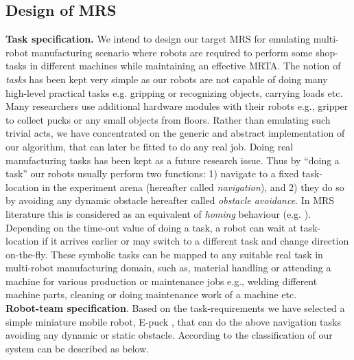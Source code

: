 \subsection{Design of MRS}
\label{expt-tools:mrs-design}
\textbf{Task specification.} We intend to design our target MRS for emulating multi-robot manufacturing scenario where robots are required to perform some shop-tasks in different machines while maintaining an effective MRTA. The notion of {\em tasks} has been kept very simple as our robots are not capable of doing many high-level practical tasks e.g. gripping or recognizing objects, carrying loads etc. Many researchers use additional hardware modules with their robots e.g., gripper to collect pucks or any small objects from floors. Rather than emulating such trivial acts, we have  concentrated on the generic and abstract implementation of our algorithm, that can later be fitted to do any real job. Doing real manufacturing tasks has been kept as a future research issue. Thus by ``doing a task'' our robots usually perform two functions: 1) navigate to a fixed task-location in the experiment arena (hereafter called {\em navigation}), and 2) they do so by avoiding any dynamic obstacle {hereafter called {\em obstacle avoidance}}. In MRS literature this is considered as an equivalent of {\em homing} behaviour (e.g. ). Depending on the time-out value of doing a task, a robot can wait at task-location if it arrives earlier or may switch to a different task and change direction on-the-fly. These symbolic tasks can be mapped to any suitable real task in multi-robot manufacturing domain, such as, material handling or attending a machine for various production or maintenance jobs e.g., welding different machine parts, cleaning or doing maintenance work of a machine etc.\\
\textbf{Robot-team specification}. Based on the task-requirements we have selected a simple miniature mobile robot, E-puck \cite{Mondada+2009}, that can do the above navigation tasks avoiding any dynamic or static obstacle. According to the classification of \cite{Dudek+1996} our system can be described as below.\\
